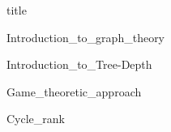 \documentclass[a4paper,12pt]{article}
\begin{document}
{title}
	
{Introduction_to_graph_theory}

{Introduction_to_Tree-Depth}

{Game_theoretic_approach}

{Cycle_rank}
\end{document}
